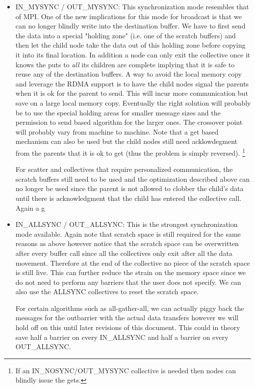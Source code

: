 \documentclass[times,10pt]{article}
\begin{document}
\begin{itemize}
\item IN\_MYSYNC / OUT\_MYSYNC: This synchronization mode resembles that of MPI. One of the new implications for this mode for broadcast is that we can no longer blindly write into the destination buffer. We have to first send the data into a special "holding zone" (i.e. one of the scratch buffers) and then let the child node take the data out of this holding zone before copying it into its final location. In addition a node can only exit the collective once it knows the puts to \textit{all} its children are complete implying that it is safe to reuse any of the destination buffers. A way to avoid the local memory copy and leverage the RDMA support is to have the child nodes signal the parents when it is ok for the parent to send. This will incur more communication but save on a large local memory copy. Eventually the right solution will probably be to use the special holding areas for smaller message sizes and the permission to send based algorithm for the larger ones. The crossover point will probably vary from machine to machine. Note that a get based mechanism can also be used but the child nodes still need acklowdegment from the parents that it is ok to get (thus the problem is simply reversed). \footnote{If an IN\_NOSYNC/OUT\_MYSYNC collective is needed then nodes can blindly issue the gets. }

For scatter and collectives that require personalized communication, the scratch buffers still need to be used and the optimization described above can no longer be used since the parent is not allowed to clobber the child's data until there is acknowledgment that the child has entered the collective call. Again a g

\item IN\_ALLSYNC / OUT\_ALLSYNC: This is the strongest synchronization mode available. Again note that scratch space is still required for the same reasons as above however notice that the scratch space can be overwritten after every buffer call since all the collectives only exit after all the data movement. Therefore at the end of the collective no piece of the scratch space is still live. This can further reduce the strain on the memory space since we do not need to perform any barriers that the user does not specify. We can also use the ALLSYNC collectives to reset the scratch space.

For certain algorithms such as all-gather-all, we can actually piggy back the messages for the outbarrier with the actual data transfers however we will hold off on this until later revisions of this document. This could in theory save half a barrier on every IN\_ALLSYNC and half a barrier on every OUT\_ALLSYNC. 

\end{itemize}
\end{document}
